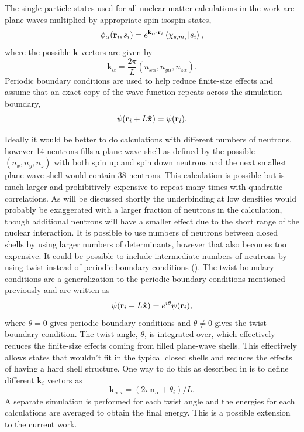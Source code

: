 The single particle states used for all nuclear matter calculations in the work are plane waves multiplied by appropriate spin-isospin states,
\begin{equation}
   \phi_\alpha(\mathbf{r}_i,s_i) = e^{\mathbf{k}_\alpha\cdot\mathbf{r}_i}\left< \chi_{s,m_s} | s_i \right>,
\end{equation}
where the possible $\mathbf{k}$ vectors are given by
\begin{equation}
   \mathbf{k}_\alpha = \frac{2\pi}{L}(n_{x\alpha},n_{y\alpha},n_{z\alpha}).
\end{equation}
Periodic boundary conditions are used to help reduce finite-size effects and assume that an exact copy of the wave function repeats across the simulation boundary,
\begin{equation}
   \psi(\mathbf{r}_i+L\hat{\mathbf{x}}) = \psi(\mathbf{r}_i).
\end{equation}

Ideally it would be better to do calculations with different numbers of neutrons, however 14 neutrons fills a plane wave shell as defined by the possible $(n_{x},n_{y},n_{z})$ with both spin up and spin down neutrons and the next smallest plane wave shell would contain 38 neutrons. This calculation is possible but is much larger and prohibitively expensive to repeat many times with quadratic correlations. As will be discussed shortly the underbinding at low densities would probably be exaggerated with a larger fraction of neutrons in the calculation, though additional neutrons will have a smaller effect due to the short range of the nuclear interaction. It is possible to use numbers of neutrons between closed shells by using larger numbers of determinants, however that also becomes too expensive. It could be possible to include intermediate numbers of neutrons by using twist instead of periodic boundary conditions (\cite{lin2001}). The twist boundary conditions are a generalization to the periodic boundary conditions mentioned previously and are written as
\begin{equation}
   \psi(\mathbf{r}_i+L\hat{\mathbf{x}}) = e^{i\theta}\psi(\mathbf{r}_i),
\end{equation}
where $\theta=0$ gives periodic boundary conditions and $\theta\ne0$ gives the twist boundary condition. The twist angle, $\theta$, is integrated over, which effectively reduces the finite-size effects coming from filled plane-wave shells. This effectively allows states that wouldn't fit in the typical closed shells and reduces the effects of having a hard shell structure. One way to do this as described in \cite{gandolfi2009} is to define different $\mathbf{k}_i$ vectors as
\begin{equation}
   \mathbf{k}_{\alpha,i} = (2\pi\mathbf{n}_\alpha + \theta_i)/L.
\end{equation}
A separate simulation is performed for each twist angle and the energies for each calculations are averaged to obtain the final energy. This is a possible extension to the current work.

